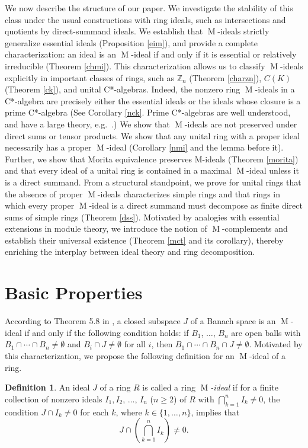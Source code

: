 \documentclass[11pt,leqno]{amsart}
\DeclareMathOperator{\m}{M}
\theoremstyle{definition}
\newtheorem{definition}{Definition}[section]
\theoremstyle{remark}
\numberwithin{equation}{section}
\numberwithin{equation}{section}
\begin{document}
We now describe the structure of our paper.
We investigate the stability of this class under the usual constructions with ring ideals, such as intersections and quotients by direct-summand ideals. 
We establish that $\m$-ideals strictly generalize essential ideals  (Proposition \ref{eim}), and provide a complete characterization: an ideal is an $\m$-ideal if and only if it is essential or relatively irreducible (Theorem \ref{chmi}). This characterization allows us to classify $\m$-ideals explicitly in important classes of rings, such as $ \mathds{Z}_n$ (Theorem \ref{charzn}), $ C(K)$ (Theorem \ref{ck}), and unital C*-algebras.  Indeed, the nonzero ring $\m$-ideals in a C*-algebra  are precisely either the essential ideals or the  ideals whose closure is a prime C*-algebra 
(See Corollary \ref{nck}.  Prime C*-algebras are well understood, and have a large theory, e.g.\ \cite{Bla06}.)   We show that $\m$-ideals are not preserved under direct sums or tensor products. We show that any unital ring with a proper ideal necessarily has a proper $\m$-ideal (Corollary \ref{nmi} and the lemma before it). Further, we show that Morita equivalence preserves M-ideals (Theorem \ref{morita}) and that every ideal of a unital ring is contained in a maximal $\m$-ideal unless it is a direct summand. From a structural standpoint, we prove  for  unital rings that the absence of proper $\m$-ideals characterizes simple rings and that rings in which every proper $\m$-ideal is a direct summand must decompose as finite direct sums of simple rings (Theorem \ref{dss}). Motivated by analogies with essential extensions in module theory, we introduce the notion of $\m$-complements and establish their universal existence (Theorem \ref{mct} and its corollary), thereby enriching the interplay between ideal theory and ring decomposition.

\section{Basic Properties}

According to Theorem 5.8 in \cite{AE72}, a closed subspace $J$ of a Banach space is an $\m$-ideal if and only if the following condition holds: if $B_1$, $\ldots$, $B_n$ are open balls with $B_1\cap \cdots\cap B_n\neq \emptyset$ and $B_i\cap J\neq \emptyset$ for all $i$, then $B_1\cap \cdots\cap B_n \cap J\neq \emptyset$. Motivated by this characterization, we propose the following definition for an $\m$-ideal of a ring.

\begin{definition}
\label{mid}
An ideal \(J \) of a ring $R$ is called a ring \emph{\(\m\)-ideal} if for a finite collection of nonzero ideals $I_1, I_2$, $\dots$, $I_n $ ($n\geqslant 2$) of $R$ with  $\bigcap_{k=1}^n I_k\neq 0$, the condition \(J \cap I_k \neq 0\) for each \(k\), where $k\in \{1, \ldots, n\}$, implies that
\[	J \cap \left( \bigcap_{k=1}^n I_k \right) \neq 0.
\]
\end{definition}
\end{document}

